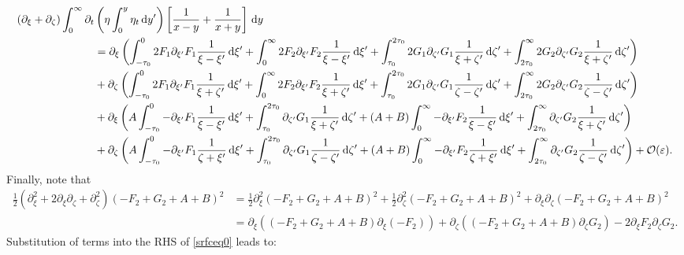 \documentclass[10pt,reqno,oneside,a4paper, landscape]{article}
\begin{document}
\begin{align*}
(\partial_\xi + \partial_\zeta)\int_0^\infty \partial_t &\left( \eta \int^{y}_0\eta_{t} \,\mathrm{d} y' \right) \left[ \frac{1}{x-y} + \frac{1}{x+y} \right] \,\mathrm{d} y \\
&= \partial_\xi
\left( \int^0_{-\tau_0} 2 F_1 \partial_{\xi'} F_1 \frac{1}{\xi -\xi'} \,\mathrm{d} \xi' + \int^{\infty}_{0} 2 F_2 \partial_{\xi'} F_2 \frac{1}{\xi -\xi'} \,\mathrm{d} \xi' + \int^{2\tau_0}_{\tau_0} 2 G_1 \partial_{\zeta'} G_1 \frac{1}{\xi + \zeta'} \,\mathrm{d} \zeta' + \int^{\infty}_{2\tau_0} 2 G_2 \partial_{\zeta'} G_2 \frac{1}{\xi + \zeta'} \,\mathrm{d} \zeta' \right) \\
&+ \partial_\zeta \left( 
\int^0_{-\tau_0} 2 F_1 \partial_{\xi'} F_1 \frac{1}{\xi + \zeta'} \,\mathrm{d} \xi' + \int^{\infty}_{0} 2 F_2 \partial_{\xi'} F_2 \frac{1}{\xi + \zeta'} \,\mathrm{d} \xi' + \int^{2\tau_0}_{\tau_0} 2 G_1 \partial_{\zeta'} G_1 \frac{1}{\zeta -\zeta'} \,\mathrm{d} \zeta' + \int^{\infty}_{2\tau_0} 2 G_2 \partial_{\zeta'} G_2 \frac{1}{\zeta -\zeta'} \,\mathrm{d} \zeta'
\right) \\
&+ \partial_\xi \left( A \int^0_{-\tau_0} -\partial_{\xi'}F_1 \frac{1}{\xi - \xi'} \,\mathrm{d} \xi' + \int^{2\tau_0}_{\tau_0} \partial_{\zeta'} G_1 \frac{1}{\xi + \zeta'} \,\mathrm{d} \zeta' + (A+B)\int_0^{\infty} -\partial_{\xi'} F_2 \frac{1}{\xi - \xi'} \,\mathrm{d} \xi' + \int_{2\tau_0}^{\infty} \partial_{\zeta'} G_2 \frac{1}{\xi + \zeta'} \,\mathrm{d} \zeta' \right) \\
&+ \partial_\zeta \left( A \int^0_{-\tau_0} -\partial_{\xi'} F_1  \frac{1}{\zeta + \xi'}  \,\mathrm{d} \xi' + \int^{2\tau_0}_{\tau_0} \partial_{\zeta'} G_1 \frac{1}{\zeta - \zeta'} \,\mathrm{d} \zeta' + (A+B) \int_0^{\infty} -\partial_{\xi'} F_2  \frac{1}{\zeta + \xi'} \,\mathrm{d} \xi'  + \int_{2\tau_0}^{\infty} \partial_{\zeta'} G_2 \frac{1}{\zeta - \zeta'}\,\mathrm{d} \zeta' \right) + \mathcal{O}(\varepsilon).
\end{align*}
Finally, note that 
\begin{align*}
\frac{1}{2} (\partial_\xi^2 + 2\partial_\xi \partial_\zeta + \partial_\zeta^2) (-F_2 + G_2 + A +B)^2 &= \frac{1}{2} \partial_\xi^2 (-F_2 + G_2 + A +B)^2 + \frac{1}{2} \partial_\zeta^2 (-F_2 + G_2 + A +B)^2 + \partial_\xi \partial_\zeta (-F_2 + G_2 + A +B)^2 \\
&= \partial_\xi ((-F_2 + G_2 + A +B)\partial_\xi(-F_2)) + \partial_\zeta ((-F_2 + G_2 + A +B)\partial_\zeta G_2) - 2 \partial_\xi F_2 \partial_\zeta G_2.
\end{align*}
Substitution of terms into the RHS of \eqref{srfceq0} leads to:
\end{document}
